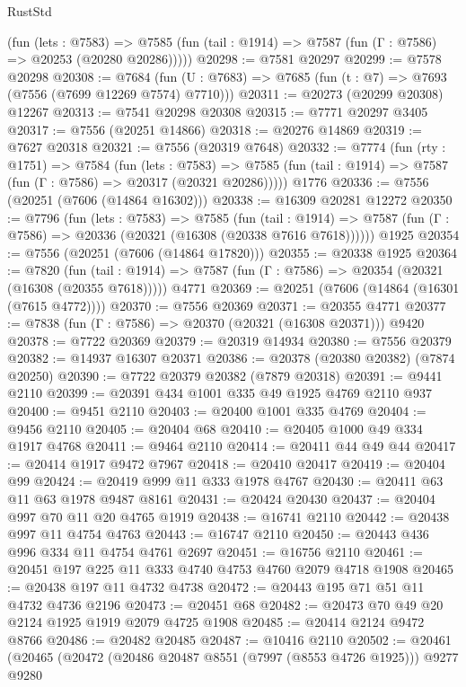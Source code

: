 \begin{lexlean}{RustStd}
\begin{coremodule}
      (fun (lets : @7583) =>
      @7585 (fun (tail : @1914) => @7587 (fun (Γ : @7586) => @20253 (@20280 @20286)))))
@20298 := @7581 @20297
@20299 := @7578 @20298
@20308 := @7684
    (fun (U : @7683) => @7685 (fun (t : @7) => @7693 (@7556 (@7699 @12269 @7574) @7710)))
@20311 := @20273 (@20299 @20308) @12267
@20313 := @7541 @20298 @20308
@20315 := @7771 @20297 @3405
@20317 := @7556 (@20251 @14866)
@20318 := @20276 @14869
@20319 := @7627 @20318
@20321 := @7556 (@20319 @7648)
@20332 := @7774
    (fun (rty : @1751) =>
    @7584
      (fun (lets : @7583) =>
      @7585 (fun (tail : @1914) => @7587 (fun (Γ : @7586) => @20317 (@20321 @20286)))))
    @1776
@20336 := @7556 (@20251 (@7606 (@14864 @16302)))
@20338 := @16309 @20281 @12272
@20350 := @7796
    (fun (lets : @7583) =>
    @7585
      (fun (tail : @1914) =>
      @7587 (fun (Γ : @7586) => @20336 (@20321 (@16308 (@20338 @7616 @7618))))))
    @1925
@20354 := @7556 (@20251 (@7606 (@14864 @17820)))
@20355 := @20338 @1925
@20364 := @7820
    (fun (tail : @1914) => @7587 (fun (Γ : @7586) => @20354 (@20321 (@16308 (@20355 @7618)))))
    @4771
@20369 := @20251 (@7606 (@14864 (@16301 (@7615 @4772))))
@20370 := @7556 @20369
@20371 := @20355 @4771
@20377 := @7838 (fun (Γ : @7586) => @20370 (@20321 (@16308 @20371))) @9420
@20378 := @7722 @20369
@20379 := @20319 @14934
@20380 := @7556 @20379
@20382 := @14937 @16307 @20371
@20386 := @20378 (@20380 @20382) (@7874 @20250)
@20390 := @7722 @20379 @20382 (@7879 @20318)
@20391 := @9441 @2110
@20399 := @20391 @434 @1001 @335 @49 @1925 @4769 @2110 @937
@20400 := @9451 @2110
@20403 := @20400 @1001 @335 @4769
@20404 := @9456 @2110
@20405 := @20404 @68
@20410 := @20405 @1000 @49 @334 @1917 @4768
@20411 := @9464 @2110
@20414 := @20411 @44 @49 @44
@20417 := @20414 @1917 @9472 @7967
@20418 := @20410 @20417
@20419 := @20404 @99
@20424 := @20419 @999 @11 @333 @1978 @4767
@20430 := @20411 @63 @11 @63 @1978 @9487 @8161
@20431 := @20424 @20430
@20437 := @20404 @997 @70 @11 @20 @4765 @1919
@20438 := @16741 @2110
@20442 := @20438 @997 @11 @4754 @4763
@20443 := @16747 @2110
@20450 := @20443 @436 @996 @334 @11 @4754 @4761 @2697
@20451 := @16756 @2110
@20461 := @20451 @197 @225 @11 @333 @4740 @4753 @4760 @2079 @4718 @1908
@20465 := @20438 @197 @11 @4732 @4738
@20472 := @20443 @195 @71 @51 @11 @4732 @4736 @2196
@20473 := @20451 @68
@20482 := @20473 @70 @49 @20 @2124 @1925 @1919 @2079 @4725 @1908
@20485 := @20414 @2124 @9472 @8766
@20486 := @20482 @20485
@20487 := @10416 @2110
@20502 := @20461
    (@20465
      (@20472
        (@20486 @20487 @8551 (@7997 (@8553 @4726 @1925)))
        @9277
        @9280

\end{coremodule}
\end{lexlean}
